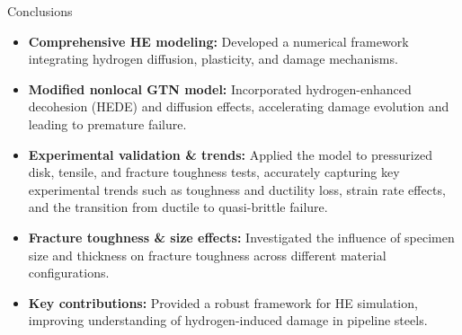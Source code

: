 \documentclass[9pt]{beamer}
\begin{document}
\begin{frame}{Conclusions}

\begin{itemize}

	\item \textbf{Comprehensive HE modeling:} Developed a numerical framework integrating hydrogen diffusion, plasticity, and damage mechanisms.
	\vspace{0.15cm}
	\item \textbf{Modified nonlocal GTN model:} Incorporated hydrogen-enhanced decohesion (HEDE) and diffusion effects, accelerating damage evolution and leading to premature failure.
	\vspace{0.15cm}
	\item \textbf{Experimental validation \& trends:} Applied the model to pressurized disk, tensile, and fracture toughness tests, accurately capturing key experimental trends such as toughness and ductility loss, strain rate effects, and the transition from ductile to quasi-brittle failure.
	\vspace{0.15cm}
	\item \textbf{Fracture toughness \& size effects:} Investigated the influence of specimen size and thickness on fracture toughness across different material configurations.
	\vspace{0.15cm}
	\item \textbf{\textcolor{MINESBlue}{Key contributions:}} Provided a robust framework for HE simulation, improving understanding of hydrogen-induced damage in pipeline steels.
	
\end{itemize}

\end{frame}

\end{document}

